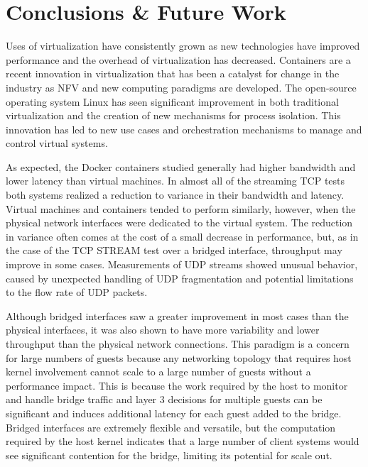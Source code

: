 \chapter{Conclusions \& Future Work}
\label{sec:conclusions}
Uses of virtualization have consistently grown as new technologies have improved performance and the overhead of virtualization has decreased.  
Containers are a recent innovation in virtualization that has been a catalyst for change in the industry as NFV and new computing paradigms are developed.
The open-source operating system Linux has seen significant improvement in both traditional virtualization and the creation of new mechanisms for process isolation.  
This innovation has led to new use cases and orchestration mechanisms to manage and control virtual systems.

As expected, the Docker containers studied generally had higher bandwidth and lower latency than virtual machines.
In almost all of the streaming TCP tests both systems realized a reduction to variance in their bandwidth and latency.
Virtual machines and containers tended to perform similarly, however, when the physical network interfaces were dedicated to the virtual system.
The reduction in variance often comes at the cost of a small decrease in performance, but, as in the case of the TCP STREAM test over a bridged interface, throughput may improve in some cases.
Measurements of UDP streams showed unusual behavior, caused by unexpected handling of UDP fragmentation and potential limitations to the flow rate of UDP packets.

Although bridged interfaces saw a greater improvement in most cases than the physical interfaces, it was also shown to have more variability and lower throughput than the physical network connections.  
This paradigm is a concern for large numbers of guests because any networking topology that requires host kernel involvement cannot scale to a large number of guests without a performance impact.
This is because the work required by the host to monitor and handle bridge traffic and layer 3 decisions for multiple guests can be significant and induces additional latency for each guest added to the bridge.    
Bridged interfaces are extremely flexible and versatile, but the computation required by the host kernel indicates that a large number of client systems would see significant contention for the bridge, limiting its potential for scale out.


